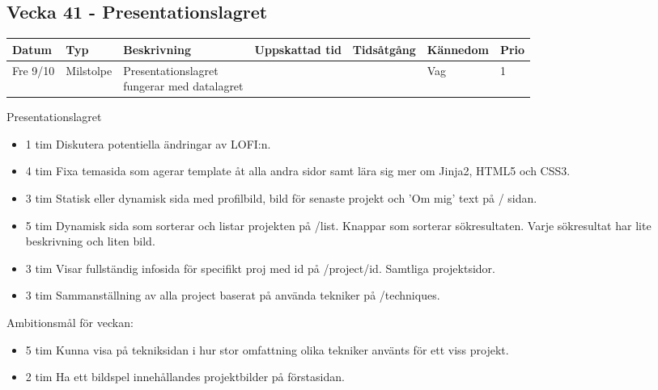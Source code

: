 \documentclass{TDP003mall}
\begin{document}
  \subsection*{Vecka 41 - Presentationslagret}
  \begin{tabularx}{\linewidth}{|l|l|X|l|l|l|l|}
  \hline
  Datum          & Typ       & Beskrivning                                                  & Uppskattad tid & Tidsåtgång & Kännedom & Prio \\ [0.5ex]
  \hline                                             
        Fre 9/10 & Milstolpe & \makecell[tl]{Presentationslagret \\fungerar med datalagret} &                &            & Vag      & 1 \\
  \hline                                             
\end{tabularx}
Presentationslagret
\begin{itemize}
  \item 1 tim Diskutera potentiella ändringar av LOFI:n. 
  \item 4 tim Fixa temasida som agerar template åt alla andra sidor samt lära sig mer om Jinja2, HTML5 och CSS3.
  \item 3 tim Statisk eller dynamisk sida med profilbild, bild för senaste projekt och 'Om mig' text på / sidan.
  \item 5 tim Dynamisk sida som sorterar och listar projekten på /list. Knappar som sorterar sökresultaten. Varje sökresultat har lite beskrivning och liten bild.                  
  \item 3 tim Visar fullständig infosida för specifikt proj med id på /project/id. Samtliga projektsidor.
  \item 3 tim Sammanställning av alla project baserat på använda tekniker på /techniques.
\end{itemize}

Ambitionsmål för veckan:
\begin{itemize}
\item 5 tim Kunna visa på tekniksidan i hur stor omfattning olika tekniker använts för ett viss projekt.
\item 2 tim Ha ett bildspel innehållandes projektbilder på förstasidan.
\end{itemize}
\end{document}
